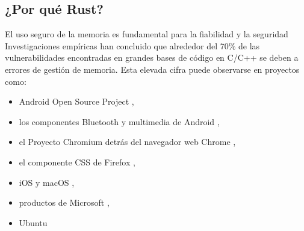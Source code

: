 \documentclass{beamer}
\begin{document}
\subsection{¿Por qué Rust?}

\begin{frame}{El uso seguro de la memoria es fundamental para la fiabilidad y la seguridad}
  Investigaciones empíricas han concluido que alrededor del 70\% de las vulnerabilidades encontradas en
  grandes bases de código en C/C++ se deben a errores de gestión de memoria.
  Esta elevada cifra puede observarse en proyectos como:

  \begin{itemize}
    \item Android Open Source Project \cite{memory-bugs-android},
    \item los componentes Bluetooth y multimedia de Android \cite{memory-bugs-android-media-bluetooth},
    \item el Proyecto Chromium detrás del navegador web Chrome \cite{memory-bugs-chrome},
    \item el componente CSS de Firefox \cite{memory-bugs-firefox},
    \item iOS y macOS \cite{memory-bugs-ios-macos},
    \item productos de Microsoft \cite{miller-security-microsoft2019, memory-bugs-microsoft},
    \item Ubuntu \cite{memory-bugs-ubuntu}
  \end{itemize}
\end{frame}
\end{document}
